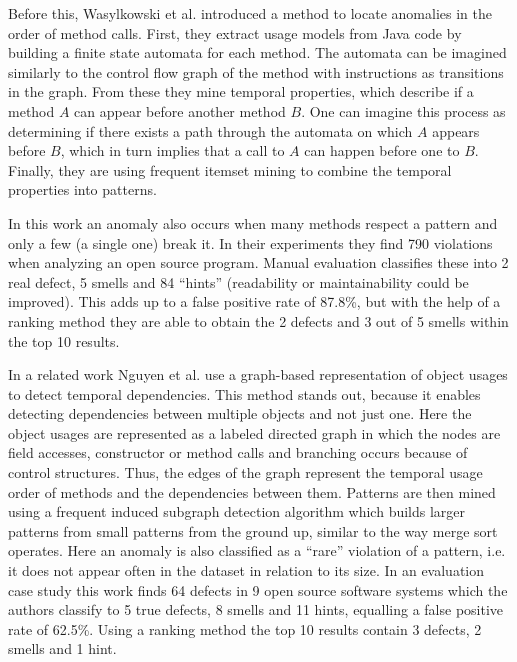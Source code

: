 
Before this, Wasylkowski et al. \cite{wasylkowski2007detecting} introduced a method to locate anomalies in the order of method calls.
First, they extract usage models from Java code by building a finite state automata for each method.
The automata can be imagined similarly to the control flow graph of the method with instructions as transitions in the graph.
From these they mine temporal properties, which describe if a method $A$ can appear before another method $B$.
One can imagine this process as determining if there exists a path through the automata on which $A$ appears before $B$, which in turn implies that a call to $A$ can happen before one to $B$.
Finally, they are using frequent itemset mining \cite{han2006data} to combine the temporal properties into patterns.

In this work an anomaly also occurs when many methods respect a pattern and only a few (a single one) break it.
In their experiments they find 790 violations when analyzing an open source program.
Manual evaluation classifies these into 2 real defect, 5 smells and 84 ``hints'' (readability or maintainability could be improved).
This adds up to a false positive rate of 87.8\%, but with the help of a ranking method they are able to obtain the 2 defects and 3 out of 5 smells within the top 10 results.

In a related work Nguyen et al. \cite{nguyen2009graph} use a graph-based representation of object usages to detect temporal dependencies.
This method stands out, because it enables detecting dependencies between multiple objects and not just one.
Here the object usages are represented as a labeled directed graph in which the nodes are field accesses, constructor or method calls and branching occurs because of control structures.
Thus, the edges of the graph represent the temporal usage order of methods and the dependencies between them.
Patterns are then mined using a frequent induced subgraph detection algorithm which builds larger patterns from small patterns from the ground up, similar to the way merge sort operates.
Here an anomaly is also classified as a ``rare'' violation of a pattern, i.e. it does not appear often in the dataset in relation to its size.
In an evaluation case study this work finds 64 defects in 9 open source software systems which the authors classify to 5 true defects, 8 smells and 11 hints, equalling a false positive rate of 62.5\%.
Using a ranking method the top 10 results contain 3 defects, 2 smells and 1 hint.

